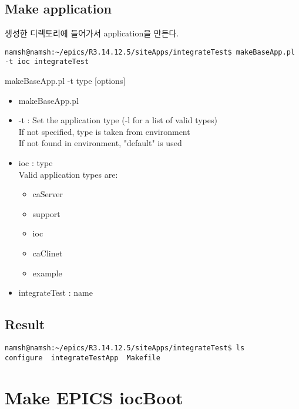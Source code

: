 \documentclass[11pt
  , a4paper
  , article
  , oneside
]{memoir}
\begin{document}
\subsection{Make application}
생성한 디렉토리에 들어가서 application을 만든다.
\begin{lstlisting}[style=termstyle]
namsh@namsh:~/epics/R3.14.12.5/siteApps/integrateTest$ makeBaseApp.pl -t ioc integrateTest
\end{lstlisting}
makeBaseApp.pl -t type [options]\\
\begin{itemize}
\item makeBaseApp.pl
\item -t : Set the application type (-l for a list of valid types)\\
If not specified, type is taken from environment\\
If not found in environment, "default" is used
\item ioc : type
\\Valid application types are:
\begin{itemize}
\item caServer
\item support
\item ioc
\item caClinet
\item example
\end{itemize}
\item integrateTest : name
\end{itemize}
\subsection{Result}
\begin{lstlisting}[style=termstyle]
namsh@namsh:~/epics/R3.14.12.5/siteApps/integrateTest$ ls
configure  integrateTestApp  Makefile
\end{lstlisting}

\section{Make EPICS iocBoot}
\end{document}
